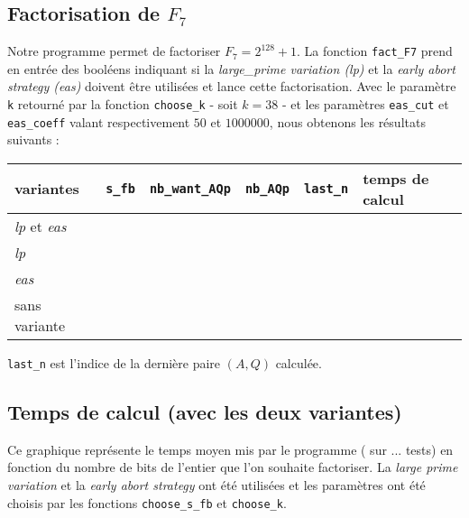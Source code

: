 \subsection{Factorisation de $F_7$}

Notre programme permet de factoriser $F_7 = 2^{128} + 1$. La fonction 
\texttt{fact\_F7} prend en entrée des booléens indiquant si la
\textit{large\_prime variation (lp)} et la \textit{early abort strategy (eas)}
doivent être utilisées et lance cette factorisation. Avec le paramètre \texttt{k}
retourné par la fonction \texttt{choose\_k} - soit $k=38$ - et les paramètres 
\texttt{eas\_cut} et \texttt{eas\_coeff} valant respectivement $50$ et $1000000$,
nous obtenons les résultats suivants :  

\begin{center}
     \begin{tabular}{| l | l| l | l | l | l |}
     \hline
         variantes                    & \texttt{s\_fb} & \texttt{nb\_want\_AQp} &\texttt{nb\_AQp}& \texttt{last\_n}  & temps de calcul  \\ \hline
     \textit{lp} et \textit{eas}      &                &                        &                &                   &                  \\ \hline
     \textit{lp}                      &                &                        &                &                   &                  \\ \hline
     \textit{eas}                     &                &                        &                &                   &                  \\ \hline
     sans variante                    &                &                        &                &                   &                  \\ \hline
    \end{tabular}
\end{center}

\quad \footnotesize{\texttt{last\_n} est l'indice de la dernière paire $(A,Q)$
calculée.}

\subsection{Temps de calcul (avec les deux variantes) }

Ce graphique représente le temps moyen mis par le programme ( sur ... tests)
en fonction du nombre de bits de l'entier que l'on souhaite factoriser. La
\textit{large prime variation} et la \textit{early abort strategy} ont été 
utilisées et les paramètres ont été choisis par les fonctions 
\texttt{choose\_s\_fb} et \texttt{choose\_k}.\\


